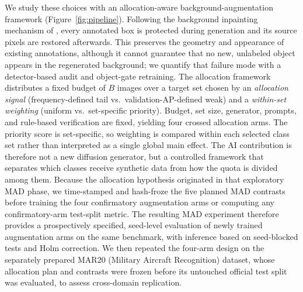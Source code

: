 \documentclass[preprint,12pt,authoryear]{elsarticle}
\begin{document}
We study these choices with an allocation-aware background-augmentation
framework (Figure~\ref{fig:pipeline}). Following the background
inpainting mechanism of \citet{li2024background}, every annotated box is
protected during generation and its source pixels are restored
afterwards. This preserves the geometry and appearance of existing
annotations, although it cannot guarantee that no new, unlabeled object
appears in the regenerated background; we quantify that failure mode
with a detector-based audit and object-gate retraining. The allocation
framework distributes a fixed budget of $B$ images over a target set
chosen by an \emph{allocation signal} (frequency-defined tail vs.\
validation-AP-defined weak) and a \emph{within-set weighting} (uniform
vs.\ set-specific priority). Budget, set size, generator, prompts, and
rule-based verification are fixed, yielding four crossed allocation
arms. The priority score is set-specific, so weighting is compared
within each selected class set rather than interpreted as a single
global main effect. The AI contribution is therefore not a new
diffusion generator, but a controlled framework that separates which
classes receive synthetic data from how the quota is divided among them.
Because the allocation hypothesis originated in that exploratory MAD
phase, we time-stamped and hash-froze the five planned MAD contrasts
before training the four confirmatory augmentation arms or computing
any confirmatory-arm test-split metric. The resulting MAD experiment
therefore provides a prospectively specified, seed-level evaluation of
newly trained augmentation arms on the same benchmark, with inference
based on seed-blocked tests and Holm correction. We then
repeated the four-arm design on the separately prepared MAR20
(Military Aircraft Recognition) dataset,
whose allocation plan and contrasts were frozen before its untouched
official test split was evaluated, to assess cross-domain replication.
\end{document}
